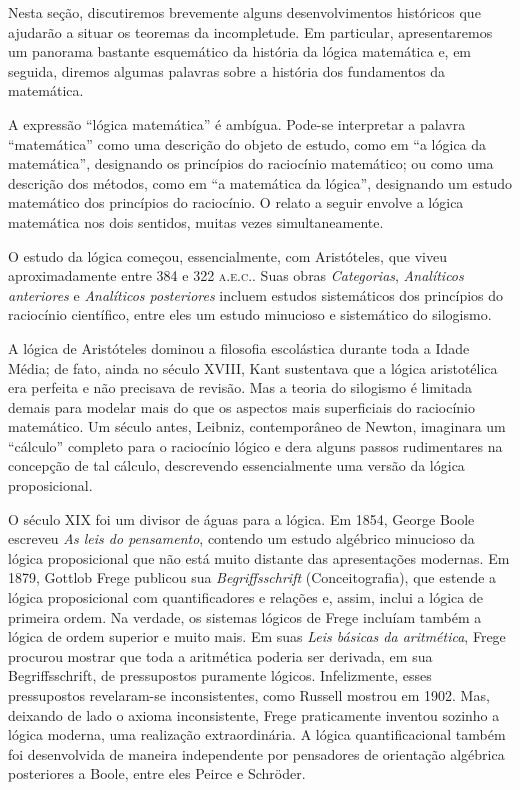 \documentclass[../../../include/open-logic-section]{subfiles}
\begin{document}


Nesta seção, discutiremos brevemente alguns desenvolvimentos históricos
que ajudarão a situar os teoremas da incompletude. Em particular,
apresentaremos um panorama bastante esquemático da história da lógica
matemática e, em seguida, diremos algumas palavras sobre a história dos
fundamentos da matemática.

\begin{digress}
  A expressão ``lógica matemática'' é ambígua. Pode-se interpretar a
  palavra ``matemática'' como uma descrição do objeto de estudo, como em
  ``a lógica da matemática'', designando os princípios do raciocínio
  matemático; ou como uma descrição dos métodos, como em ``a matemática
  da lógica'', designando um estudo matemático dos princípios do
  raciocínio. O relato a seguir envolve a lógica matemática nos dois
  sentidos, muitas vezes simultaneamente.
\end{digress}

O estudo da lógica começou, essencialmente, com Aristóteles, que viveu
aproximadamente entre 384 e 322 \textsc{a.e.c.}. Suas obras
\emph{Categorias}, \emph{Analíticos anteriores} e \emph{Analíticos
  posteriores} incluem estudos sistemáticos dos princípios do
raciocínio científico, entre eles um estudo minucioso e sistemático do
silogismo.

A lógica de Aristóteles dominou a filosofia escolástica durante toda a
Idade Média; de fato, ainda no século XVIII, Kant sustentava que a
lógica aristotélica era perfeita e não precisava de revisão. Mas a
teoria do silogismo é limitada demais para modelar mais do que os
aspectos mais superficiais do raciocínio matemático. Um século antes,
Leibniz, contemporâneo de Newton, imaginara um ``cálculo'' completo para
o raciocínio lógico e dera alguns passos rudimentares na concepção de
tal cálculo, descrevendo essencialmente uma versão da lógica
proposicional.

O século XIX foi um divisor de águas para a lógica. Em 1854, George
Boole escreveu \emph{As leis do pensamento}, contendo um estudo
algébrico minucioso da lógica proposicional que não está muito distante
das apresentações modernas. Em 1879, Gottlob Frege publicou sua
\emph{Begriffsschrift} (Conceitografia), que estende a lógica
proposicional com quantificadores e relações e, assim, inclui a lógica
de primeira ordem. Na verdade, os sistemas lógicos de Frege incluíam
também a lógica de ordem superior e muito mais. Em suas \emph{Leis
  básicas da aritmética}, Frege procurou mostrar que toda a aritmética
poderia ser derivada, em sua Begriffsschrift, de pressupostos puramente
lógicos. Infelizmente, esses pressupostos revelaram-se inconsistentes,
como Russell mostrou em 1902. Mas, deixando de lado o axioma
inconsistente, Frege praticamente inventou sozinho a lógica moderna,
uma realização extraordinária. A lógica quantificacional também foi
desenvolvida de maneira independente por pensadores de orientação
algébrica posteriores a Boole, entre eles Peirce e Schr\"oder.
\end{document}
